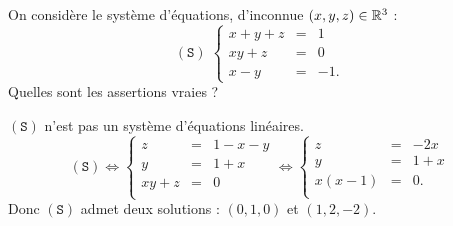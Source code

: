 \begin{question}
On considère le système d'équations, d'inconnue $(x,y,z)\in \mathbb{R}^3$ :  
$$(\mathtt{S}) \; \left\{\begin{array}{rcc}
x+y+z&=&1\\
xy+z&=&0\\
x-y&=&-1.\end{array}\right.$$
Quelles sont les assertions vraies ?
\begin{answers}  
\end{answers}
\begin{explanations} $(\mathtt{S})$ n'est pas un système d'équations linéaires.
$$(\mathtt{S}) \Leftrightarrow  \left\{\begin{array}{rcc}
z&=&1-x-y\\
y&=&1+x\\ 
xy+z&=&0\\ 
\end{array}\right. \Leftrightarrow  \left\{\begin{array}{rcc}
z&=&-2x\\
y&=&1+x\\ 
x(x-1)&=&0.\\ 
\end{array}\right. $$
Donc $(\mathtt{S})$ admet deux solutions : $(0,1,0)$ et $(1,2,-2)$.
\end{explanations}
\end{question}


